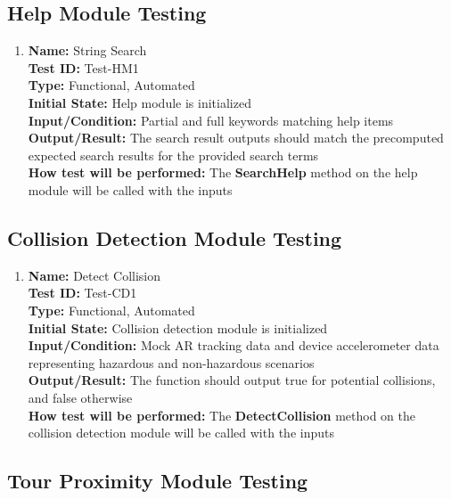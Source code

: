 \documentclass[12pt, titlepage]{article}
\begin{document}
\subsection{Help Module Testing}
\begin{enumerate}
  \item \textbf{Name:} String Search \label{itm:Test-HM1} \\
        \textbf{Test ID:} Test-HM1 \\
        \textbf{Type:} Functional, Automated \\
        \textbf{Initial State:} Help module is initialized \\
        \textbf{Input/Condition:} Partial and full keywords matching help items  \\
        \textbf{Output/Result:} The search result outputs should match the precomputed expected search results for the provided search terms  \\
        \textbf{How test will be performed:} The \textbf{SearchHelp} method on the help module will be called with the inputs

\end{enumerate}


\subsection{Collision Detection Module Testing}
\begin{enumerate}
  \item \textbf{Name:} Detect Collision \label{itm:Test-CD1} \\
        \textbf{Test ID:} Test-CD1 \\
        \textbf{Type:} Functional, Automated \\
        \textbf{Initial State:} Collision detection module is initialized \\
        \textbf{Input/Condition:} Mock AR tracking data and device accelerometer data representing hazardous and non-hazardous scenarios \\
        \textbf{Output/Result:} The function should output true for potential collisions, and false otherwise \\
        \textbf{How test will be performed:} The \textbf{DetectCollision} method on the collision detection module will be called with the inputs

\end{enumerate}

\subsection{Tour Proximity Module Testing}
\end{document}
